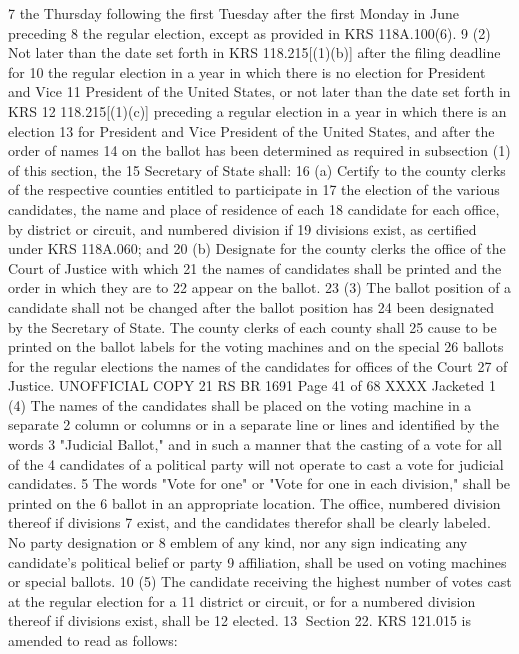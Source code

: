 7 the Thursday following the first Tuesday after the first Monday in June preceding
8 the regular election, except as provided in KRS 118A.100(6).
9 (2) Not later than the date set forth in KRS 118.215[(1)(b)] after the filing deadline for
10 the regular election in a year in which there is no election for President and Vice
11 President of the United States, or not later than the date set forth in KRS
12 118.215[(1)(c)] preceding a regular election in a year in which there is an election
13 for President and Vice President of the United States, and after the order of names
14 on the ballot has been determined as required in subsection (1) of this section, the
15 Secretary of State shall:
16 (a) Certify to the county clerks of the respective counties entitled to participate in
17 the election of the various candidates, the name and place of residence of each
18 candidate for each office, by district or circuit, and numbered division if
19 divisions exist, as certified under KRS 118A.060; and
20 (b) Designate for the county clerks the office of the Court of Justice with which
21 the names of candidates shall be printed and the order in which they are to
22 appear on the ballot.
23 (3) The ballot position of a candidate shall not be changed after the ballot position has
24 been designated by the Secretary of State. The county clerks of each county shall
25 cause to be printed on the ballot labels for the voting machines and on the special
26 ballots for the regular elections the names of the candidates for offices of the Court
27 of Justice.
UNOFFICIAL COPY 21 RS BR 1691
Page 41 of 68
XXXX Jacketed
1 (4) The names of the candidates shall be placed on the voting machine in a separate
2 column or columns or in a separate line or lines and identified by the words
3 "Judicial Ballot," and in such a manner that the casting of a vote for all of the
4 candidates of a political party will not operate to cast a vote for judicial candidates.
5 The words "Vote for one" or "Vote for one in each division," shall be printed on the
6 ballot in an appropriate location. The office, numbered division thereof if divisions
7 exist, and the candidates therefor shall be clearly labeled. No party designation or
8 emblem of any kind, nor any sign indicating any candidate's political belief or party
9 affiliation, shall be used on voting machines or special ballots.
10 (5) The candidate receiving the highest number of votes cast at the regular election for a
11 district or circuit, or for a numbered division thereof if divisions exist, shall be
12 elected.
13 Section 22. KRS 121.015 is amended to read as follows:
